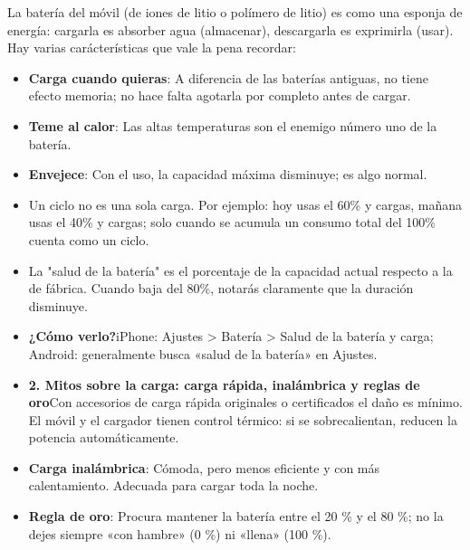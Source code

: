


La batería del móvil (de iones de litio o polímero de litio) es como una esponja de energía: cargarla es absorber agua (almacenar), descargarla es exprimirla (usar). Hay varias carácterísticas que vale la pena recordar:

\begin{itemize}
  \item \textbf{Carga cuando quieras}: A diferencia de las baterías antiguas, no tiene efecto memoria; no hace falta agotarla por completo antes de cargar.
  \item \textbf{Teme al calor}: Las altas temperaturas son el enemigo número uno de la batería.
  \item \textbf{Envejece}: Con el uso, la capacidad máxima disminuye; es algo normal.
\end{itemize}


\begin{itemize}
  \item Un ciclo no es una sola carga. Por ejemplo: hoy usas el 60\% y cargas, mañana usas el 40\% y cargas; solo cuando se acumula un consumo total del 100\% cuenta como un ciclo.
  \item La "salud de la batería" es el porcentaje de la capacidad actual respecto a la de fábrica. Cuando baja del 80\%, notarás claramente que la duración disminuye.
  \item \textbf{¿Cómo verlo?}iPhone: Ajustes > Batería > Salud de la batería y carga; Android: generalmente busca «salud de la batería» en Ajustes.
\end{itemize}


\begin{itemize}
  \item \textbf{2. Mitos sobre la carga: carga rápida, inalámbrica y reglas de oro}Con accesorios de carga rápida originales o certificados el daño es mínimo. El móvil y el cargador tienen control térmico: si se sobrecalientan, reducen la potencia automáticamente.
  \item \textbf{Carga inalámbrica}: Cómoda, pero menos eficiente y con más calentamiento. Adecuada para cargar toda la noche.
  \item \textbf{Regla de oro}: Procura mantener la batería entre el 20 \% y el 80 \%; no la dejes siempre «con hambre» (0 \%) ni «llena» (100 \%).
\end{itemize}


